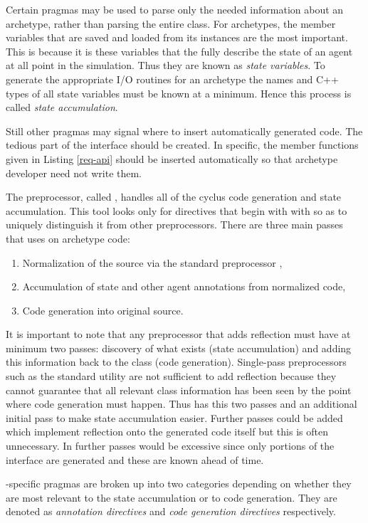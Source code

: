 Certain pragmas may be used to parse only the needed information 
about an archetype, rather than parsing the entire class. For archetypes, the 
member variables that are saved and loaded from its instances are the most important.
This is because it is these variables that the fully describe the state of an agent 
at all point in the simulation. Thus they are known as \emph{state variables}. 
To generate the appropriate I/O routines for an archetype the names and C++ types 
of all state variables must be known at a minimum. Hence this process is 
called \emph{state accumulation}. 

Still other pragmas may 
signal where to insert automatically generated code. The tedious 
part of the  interface should be created. In specific, 
the member functions given in Listing \ref{req-api} should be inserted automatically
so that archetype developer need not write them.

The \cyclus preprocessor, called \cycpp, handles all of the cyclus code generation
and state accumulation. This tool looks only for directives that begin with 
with  so as to uniquely distinguish it from other preprocessors.
There are three main passes that \cycpp uses on archetype code:
\begin{enumerate}
    \item Normalization of the source via the standard preprocessor , 
    \item Accumulation of state and other agent annotations from normalized code, 
    \item Code generation into original source.
\end{enumerate}
It is important to note that any preprocessor that adds reflection must have at
minimum two passes: discovery of what exists (state accumulation) and adding this
information back to the class (code generation). Single-pass preprocessors such 
as the standard  utility are not sufficient to add reflection because they 
cannot guarantee that all relevant class information has been seen by the point 
where code generation must happen. Thus \cycpp has this two passes and an additional 
initial pass to make state accumulation easier. Further passes could be added which 
implement reflection onto the generated code itself but this is often unnecessary. 
In \cyclus further passes would be excessive since only portions of the 
 interface are generated and these are known ahead of time.

\cyclus-specific pragmas are broken up into two categories depending on whether 
they are most relevant to the state accumulation or to code generation. They 
are denoted as \emph{annotation directives} and \emph{code generation directives}
respectively.

